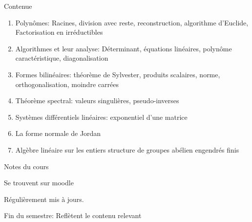    \begin{frame}{Contenue}
   
     \begin{enumerate}
     \item Polynômes: {\small Racines, division avec reste,
         reconstruction, algorithme d'Euclide, Factorisation en
         irréductibles }
     \item Algorithmes et leur analyse:  {\small Déterminant, équations linéaires, polynôme caractéristique, diagonalisation }
     \item  Formes bilinéaires: {\small théorème de Sylvester, produits scalaires, norme, orthogonalisation, moindre carrées }
     \item Théorème spectral: {\small  valeurs singulières, pseudo-inverses}
     \item Systèmes différentiels linéaires: {\small exponentiel d'une matrice}
     \item La forme normale de Jordan
     \item  Algèbre linéaire sur les entiers{ \small structure de groupes abélien  engendrés finis }
   \end{enumerate}

   \end{frame}

   \begin{frame}{Notes du cours}

     \bigskip 
     
     Se trouvent sur moodle

     \bigskip 
     {Régulièrement}  mis à jours.

     \bigskip 
     {Fin du semestre}: Reflètent le contenu  relevant  
   
     
   \end{frame}
   


